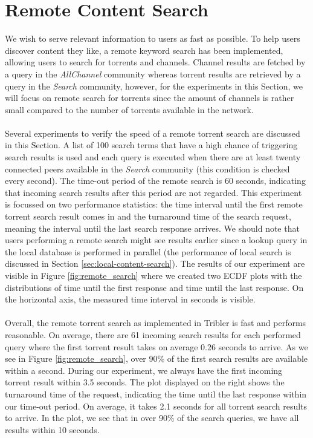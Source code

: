 \section{Remote Content Search}
\label{sec:remote-content-search-experiment}
We wish to serve relevant information to users as fast as possible. To help users discover content they like, a remote keyword search has been implemented, allowing users to search for torrents and channels. Channel results are fetched by a query in the \emph{AllChannel} community whereas torrent results are retrieved by a query in the \emph{Search} community, however, for the experiments in this Section, we will focus on remote search for torrents since the amount of channels is rather small compared to the number of torrents available in the network.\\\\
Several experiments to verify the speed of a remote torrent search are discussed in this Section. A list of 100 search terms that have a high chance of triggering search results is used and each query is executed when there are at least twenty connected peers available in the \emph{Search} community (this condition is checked every second). The time-out period of the remote search is 60 seconds, indicating that incoming search results after this period are not regarded. This experiment is focussed on two performance statistics: the time interval until the first remote torrent search result comes in and the turnaround time of the search request, meaning the interval until the last search response arrives. We should note that users performing a remote search might see results earlier since a lookup query in the local database is performed in parallel (the performance of local search is discussed in Section \ref{sec:local-content-search}). The results of our experiment are visible in Figure \ref{fig:remote_search} where we created two ECDF plots with the distributions of time until the first response and time until the last response. On the horizontal axis, the measured time interval in seconds is visible.\\\\
Overall, the remote torrent search as implemented in Tribler is fast and performs reasonable. On average, there are 61 incoming search results for each performed query where the first torrent result takes on average 0.26 seconds to arrive. As we see in Figure \ref{fig:remote_search}, over 90\% of the first search results are available within a second. During our experiment, we always have the first incoming torrent result within 3.5 seconds. The plot displayed on the right shows the turnaround time of the request, indicating the time until the last response within our time-out period. On average, it takes 2.1 seconds for all torrent search results to arrive. In the plot, we see that in over 90\% of the search queries, we have all results within 10 seconds.\\

